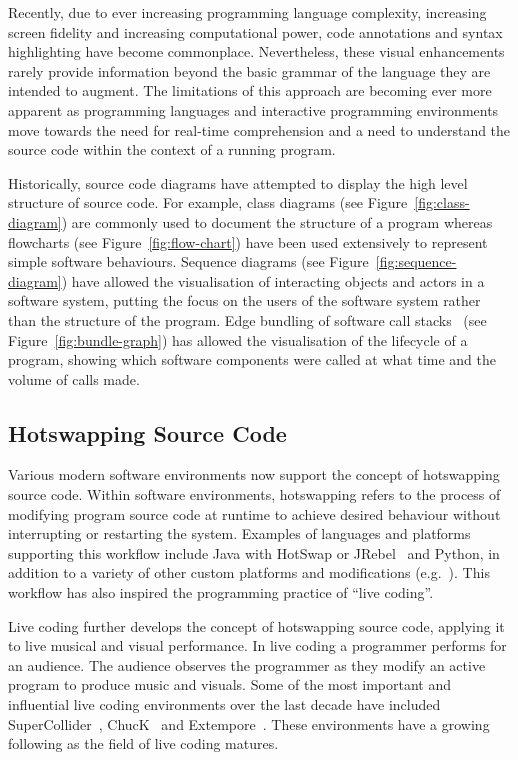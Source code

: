 Recently, due to ever increasing programming language complexity, increasing screen fidelity and increasing computational power, code annotations and syntax highlighting have become commonplace. Nevertheless, these visual enhancements rarely provide information beyond the basic grammar of the language they are intended to augment. The limitations of this approach are becoming ever more apparent as programming languages and interactive programming environments move towards the need for real-time comprehension and a need to understand the source code within the context of a running program.

Historically, source code diagrams have attempted to display the high level structure of source code. For example, class diagrams (see Figure~\ref{fig:class-diagram}) are commonly used to document the structure of a program whereas flowcharts (see Figure~\ref{fig:flow-chart}) have been used extensively to represent simple software behaviours. Sequence diagrams (see Figure~\ref{fig:sequence-diagram}) have allowed the visualisation of interacting objects and actors in a software system, putting the focus on the users of the software system rather than the structure of the program. Edge bundling of software call stacks~\cite{Zhou2013} (see Figure~\ref{fig:bundle-graph}) has allowed the visualisation of the lifecycle of a program, showing which software components were called at what time and the volume of calls made.

\subsection{Hotswapping Source Code}

Various modern software environments now support the concept of hotswapping source code. Within software environments, hotswapping refers to the process of modifying program source code at runtime to achieve desired behaviour without interrupting or restarting the system. Examples of languages and platforms supporting this workflow include Java with HotSwap or JRebel~\cite{ZeroTurnaround2014} and Python, in addition to a variety of other custom platforms and modifications (e.g.~\cite{Thomas2011}). This workflow has also inspired the programming practice of ``live coding''. 

Live coding further develops the concept of hotswapping source code, applying it to live musical and visual performance. In live coding a programmer performs for an audience. The audience observes the programmer as they modify an active program to produce music and visuals. Some of the most important and influential live coding environments over the last decade have included SuperCollider~\cite{McCartney}, ChucK~\cite{Wang2008} and Extempore~\cite{Sorensen}. These environments have a growing following as the field of live coding matures.

